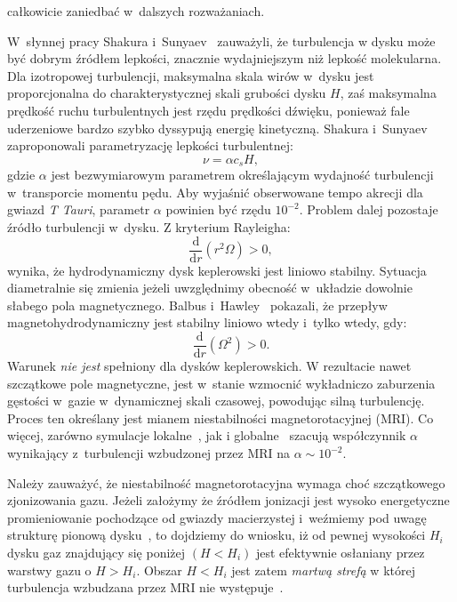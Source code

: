 całkowicie zaniedbać w~dalszych rozważaniach.
\par W~słynnej pracy Shakura i~Sunyaev~\citep{SS73} zauważyli, że turbulencja
w dysku może być dobrym źródłem lepkości, znacznie wydajniejszym niż lepkość
molekularna. Dla izotropowej turbulencji, maksymalna skala wirów w~dysku jest
proporcjonalna do charakterystycznej skali grubości dysku $H$, zaś maksymalna
prędkość ruchu turbulentnych jest rzędu prędkości dźwięku, ponieważ fale
uderzeniowe bardzo szybko dyssypują energię kinetyczną. Shakura i~Sunyaev
zaproponowali parametryzację lepkości turbulentnej:
%
\begin{equation}\label{eq:alpha}
\nu = \alpha c_s H,
\end{equation}
%
gdzie $\alpha$ jest bezwymiarowym parametrem określającym wydajność
turbulencji w~transporcie momentu pędu. Aby wyjaśnić obserwowane tempo akrecji
dla gwiazd \emph{T Tauri}, parametr $\alpha$ powinien być rzędu $10^{-2}$.
Problem dalej pozostaje źródło turbulencji w~dysku. Z kryterium
Rayleigha:
%
\begin{equation}
   \frac{\mathrm{d}}{\mathrm{d}r}\left(r^2\Omega\right) > 0,
\end{equation}
%
wynika, że hydrodynamiczny dysk keplerowski jest liniowo stabilny. Sytuacja
diametralnie się zmienia jeżeli uwzględnimy obecność w~układzie dowolnie
słabego pola magnetycznego. Balbus i~Hawley~\citep{BH91} pokazali, że przepływ
magnetohydrodynamiczny jest stabilny liniowo wtedy i~tylko wtedy, gdy:
%
\begin{equation}\label{eq:mri}
   \frac{\mathrm{d}}{\mathrm{d}r}\left(\Omega^2\right) > 0.
\end{equation}
%
Warunek  \emph{nie jest} spełniony dla dysków keplerowskich. W
rezultacie nawet szczątkowe pole magnetyczne, jest w~stanie wzmocnić wykładniczo
zaburzenia gęstości w~gazie w~dynamicznej skali czasowej, powodując silną
turbulencję. Proces ten określany jest mianem niestabilności magnetorotacyjnej
(MRI). Co więcej, zarówno symulacje lokalne~\cite{DSP10}, jak
i globalne~\cite{FD11} szacują współczynnik $\alpha$ wynikający z~turbulencji
wzbudzonej przez MRI na $\alpha\sim 10^{-2}$.
\par Należy zauważyć, że niestabilność magnetorotacyjna wymaga choć szczątkowego
zjonizowania gazu. Jeżeli założymy że źródłem jonizacji jest wysoko energetyczne
promieniowanie pochodzące od gwiazdy macierzystej i~weźmiemy pod uwagę strukturę
pionową dysku~, to dojdziemy do wniosku, iż od pewnej wysokości
$H_i$ dysku gaz znajdujący się poniżej $(H < H_i)$ jest efektywnie osłaniany
przez warstwy gazu o $H > H_i$. Obszar $H < H_i$ jest zatem \emph{martwą strefą}
w której turbulencja wzbudzana przez MRI nie występuje~\cite{DFT10}.

